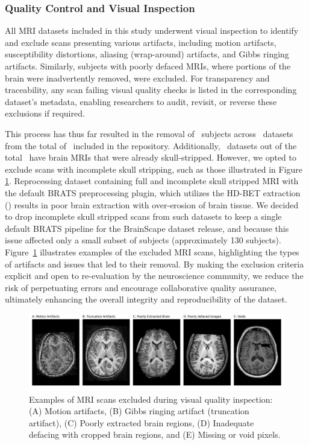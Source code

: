 \subsubsection{Quality Control and Visual Inspection}

All MRI datasets included in this study underwent visual inspection to identify and exclude scans presenting various artifacts, 
including motion artifacts, susceptibility distortions, aliasing (wrap-around) artifacts, and Gibbs ringing artifacts. 
Similarly, subjects with poorly defaced MRIs, where portions of the brain were inadvertently removed, were excluded. For transparency and 
traceability, any scan failing visual quality checks is listed in the corresponding dataset's metadata, enabling researchers to audit, 
revisit, or reverse these exclusions if required.

This process has thus far resulted in the removal of \TotalNumSubjectsRemoved\ subjects across \TotalNumDatasetsWithSubjectsRemoved\ datasets 
from the total of \NumDatasets\ included in the repository. 
Additionally, \NumDatasetsAlreadySkullStripped\ datasets out of the total \NumDatasets\ have brain MRIs that were already skull-stripped. 
However, we opted to exclude scans with incomplete skull stripping, such as those illustrated in Figure \ref{dropped_subject}. 
Reprocessing dataset containing full and incomplete skull stripped MRI with the default BRATS preprocessing plugin,
which utilizes the HD-BET extraction (\cite{isensee2019automated}) results in poor brain extraction with over-erosion of brain tissue.
We decided to drop incomplete skull stripped scans from such datasets to keep a single default BRATS pipeline for the BrainScape dataset release, 
and because this issue affected only a small subset of subjects (approximately 130 subjects).
Figure~\ref{dropped_subject} illustrates examples of the excluded MRI scans, highlighting the types of artifacts and issues that led to their removal. By making the exclusion 
criteria explicit and open to re-evaluation by the neuroscience community, we reduce the risk of perpetuating errors and encourage collaborative quality assurance, 
ultimately enhancing the overall integrity and reproducibility of the dataset.


\begin{figure}[htbp]\begin{center}\includegraphics[width=\linewidth]{figures/dropped_subjects.png}
    \caption{
        Examples of MRI scans excluded during visual quality inspection:
        (A) Motion artifacts, 
        (B) Gibbs ringing artifact (truncation artifact), 
        (C) Poorly extracted brain regions, 
        (D) Inadequate defacing with cropped brain regions, 
        and (E) Missing or void pixels.
    }
    \label{dropped_subject}\end{center}
\end{figure}


